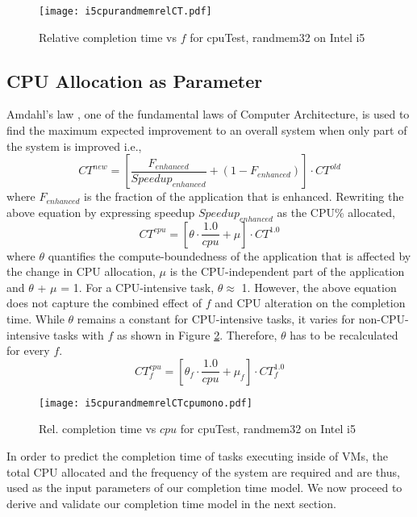 \documentclass{sig-alternate}
\begin{document}
\begin{figure}
\centering
\texttt{[image: i5cpurandmemrelCT.pdf]}
\caption{Relative completion time vs $f$ for cpuTest, randmem32 on Intel i5}
\label{fig:i5cpurandmemrelCT}
\vspace{-0.5cm}
\end{figure}
\subsection{CPU Allocation as Parameter}
\label{sec:cpuCT}

Amdahl's law \cite{Amdahl1967}, one of the fundamental laws of Computer Architecture, is used to find the maximum expected improvement to an overall system when only part of the system is improved i.e., 
$$CT^{new} = [\frac{F_{enhanced}}{Speedup_{enhanced}} + (1-F_{enhanced})] \cdot CT^{old}$$
where $F_{enhanced}$ is the fraction of the application that is enhanced. Rewriting the above equation by expressing speedup $Speedup_{enhanced}$ as the CPU\% allocated, $$CT^{cpu} = [ \theta \cdot \frac{1.0}{cpu} + \mu ] \cdot CT^{1.0} $$ where $\theta$ quantifies the compute-boundedness of the application that is affected by the change in CPU allocation, $\mu$ is the CPU-independent part of the application and $\theta$ + $\mu$ = 1. For a CPU-intensive task, $\theta \approx $ 1. However, the above equation does not capture the combined effect of $f$ and CPU alteration on the completion time. While $\theta$ remains a constant for CPU-intensive tasks, it varies for non-CPU-intensive tasks with $f$ as shown in Figure \ref{fig:i5cpurandmemrelCTcpumono}. Therefore, $\theta$ has to be recalculated for every $f$.
\begin{equation}
 \label{eq:cpu}
 CT^{cpu}_{f} = [ \theta _{f}\cdot \frac{1.0}{cpu} + \mu _{f} ] \cdot CT^{1.0}_{f}
\end{equation}
\begin{figure}[!htbp]
\vspace{-0.5cm}
\centering
\texttt{[image: i5cpurandmemrelCTcpumono.pdf]}
\caption{Rel. completion time vs $cpu$ for cpuTest, randmem32 on Intel i5}
\label{fig:i5cpurandmemrelCTcpumono}
\end{figure}

In order to predict the completion time of tasks executing inside of VMs, the total CPU allocated and the frequency of the system are required and are thus, used as the input parameters of our completion time model. We now proceed to derive and validate our completion time model in the next section. 
\end{document}
